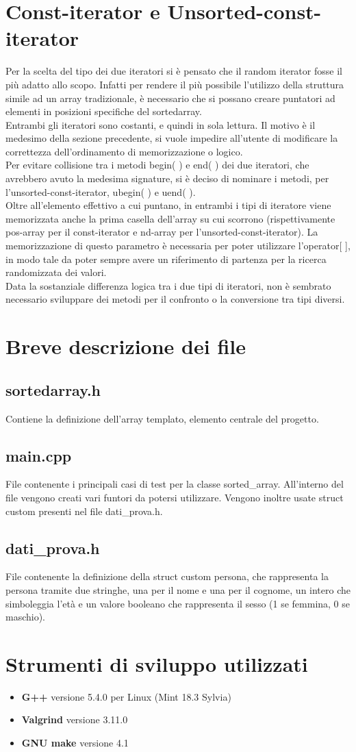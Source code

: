 \documentclass[11pt]{article}
\begin{document}
\section*{Const-iterator e Unsorted-const-iterator}
Per la scelta del tipo dei due iteratori si è pensato che il random iterator fosse il più adatto allo scopo. Infatti per rendere il più possibile l'utilizzo della struttura simile ad un array tradizionale, è necessario che si possano creare puntatori ad elementi in posizioni specifiche del sortedarray.\\
Entrambi gli iteratori sono costanti, e quindi in sola lettura. Il motivo è il medesimo della sezione precedente, si vuole impedire all'utente di modificare la correttezza dell'ordinamento di memorizzazione o logico.\\
Per evitare collisione tra i metodi begin( ) e end( ) dei due iteratori, che avrebbero avuto la medesima signature, 
si è deciso di nominare i metodi, per l'unsorted-const-iterator, ubegin( ) e uend( ).\\
Oltre all'elemento effettivo a cui puntano, in entrambi i tipi di iteratore viene memorizzata anche la prima casella 
dell'array su cui scorrono (rispettivamente pos-array per il const-iterator e nd-array per l'unsorted-const-iterator).
La memorizzazione di questo parametro è necessaria per poter utilizzare l'operator[ ], in modo tale da poter sempre avere un riferimento di partenza per la ricerca randomizzata dei valori.\\
Data la sostanziale differenza logica tra i due tipi di iteratori, non è sembrato necessario sviluppare dei metodi 
per il confronto o la conversione tra tipi diversi.
\section*{Breve descrizione dei file}
\subsection*{sortedarray.h}
Contiene la definizione dell'array templato, elemento centrale del progetto.
\subsection*{main.cpp}
File contenente i principali casi di test per la classe sorted\_array. All'interno del file vengono creati vari 
funtori da potersi utilizzare. Vengono inoltre usate struct custom presenti nel file dati\_prova.h.
\subsection*{dati\_prova.h}
File contenente la definizione della struct custom persona, che rappresenta la persona tramite due stringhe, una per 
il nome e una per il cognome, un intero che simboleggia l'età e un valore booleano che rappresenta il sesso 
(1 se femmina, 0 se maschio).
\section*{Strumenti di sviluppo utilizzati}
\begin{itemize}
\item \textbf{G++} versione 5.4.0 per Linux (Mint 18.3 Sylvia)
\item \textbf{Valgrind} versione 3.11.0
\item \textbf{GNU make} versione 4.1
\end{itemize} 
\end{document}
